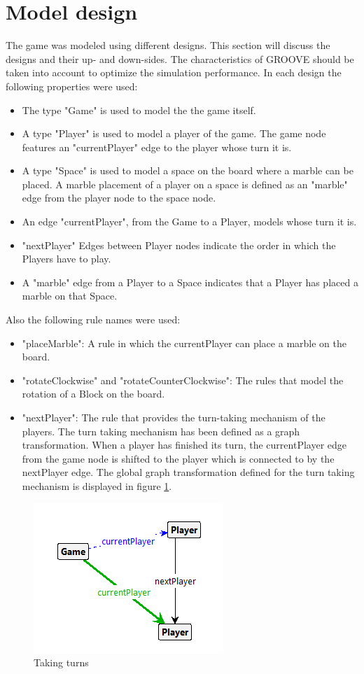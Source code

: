 \section{Model design}
\label{Design}
The game was modeled using different designs. This section will discuss the designs and their up- and down-sides.
The characteristics of GROOVE should be taken into account to optimize the simulation performance. 
In each design the following properties were used:

\begin{itemize}
\item The type "Game" is used to model the the game itself.
\item A type "Player" is used to model a player of the game. The game node features an "currentPlayer" edge to the player whose turn it is.
\item A type "Space" is used to model a space on the board where a marble can be placed. A marble placement of a player on a space is defined as an "marble" edge from the player node to the space node.
\item An edge "currentPlayer", from the Game to a Player, models whose turn it is.
\item "nextPlayer" Edges between Player nodes indicate the order in which the Players have to play.
\item A "marble" edge from a Player to a Space indicates that a Player has placed a marble on that Space.
\end{itemize}

Also the following rule names were used:

\begin{itemize}
\item "placeMarble": A rule in which the currentPlayer can place a marble on the board.
\item "rotateClockwise" and "rotateCounterClockwise": The rules that model the rotation of a Block on the board.
\item "nextPlayer": The rule that provides the turn-taking mechanism of the players. The turn taking mechanism has been defined as a graph transformation.
When a player has finished its turn, the currentPlayer edge from the game node is shifted to the player which is connected to by the nextPlayer edge.
The global graph transformation defined for the turn taking mechanism is displayed in figure \ref{fig:turn}.
\end{itemize}

\begin{figure}[!h]
    \centering
    \includegraphics[scale=0.5,clip]{Images/turn.png}
    \caption{Taking turns}
    \label{fig:turn}
\end{figure}

